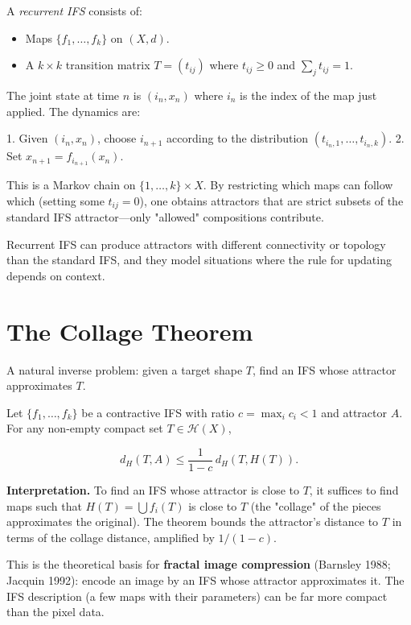 \begin{definition}
A \textit{recurrent IFS} consists of:

\begin{itemize}
\item Maps $\{ f_1, \ldots, f_k\} $ on $(X, d)$.
\item A $k \times k$ transition matrix $T = (t_{ij})$ where $t_{ij} \ge 0$ and $\sum_j t_{ij} = 1$.

\end{itemize}
The joint state at time $n$ is $(i_n, x_n)$ where $i_n$ is the index of the map just applied. The dynamics are:

1. Given $(i_n, x_n)$, choose $i_{n+1}$ according to the distribution $(t_{i_n, 1}, \ldots, t_{i_n, k})$.
2. Set $x_{n+1} = f_{i_{n+1}}(x_n)$.

This is a Markov chain on $\{ 1, \ldots, k\}  \times X$. By restricting which maps can follow which (setting some $t_{ij} = 0$), one obtains attractors that are strict subsets of the standard IFS attractor—only "allowed" compositions contribute.

Recurrent IFS can produce attractors with different connectivity or topology than the standard IFS, and they model situations where the rule for updating depends on context.
\end{definition}

\section{The Collage Theorem}

A natural inverse problem: given a target shape $T$, find an IFS whose attractor approximates $T$.

\begin{theorem}
Let $\{ f_1, \ldots, f_k\} $ be a contractive IFS with ratio $c = \max_i c_i < 1$ and attractor $A$. For any non-empty compact set $T \in \mathcal{H}(X)$,

\[d_H(T, A) \le \frac{1}{1 - c} \, d_H(T, H(T)).\]

\textbf{Interpretation.} To find an IFS whose attractor is close to $T$, it suffices to find maps such that $H(T) = \bigcup f_i(T)$ is close to $T$ (the "collage" of the pieces approximates the original). The theorem bounds the attractor's distance to $T$ in terms of the collage distance, amplified by $1/(1-c)$.

This is the theoretical basis for \textbf{fractal image compression} (Barnsley 1988; Jacquin 1992): encode an image by an IFS whose attractor approximates it. The IFS description (a few maps with their parameters) can be far more compact than the pixel data.
\end{theorem}

